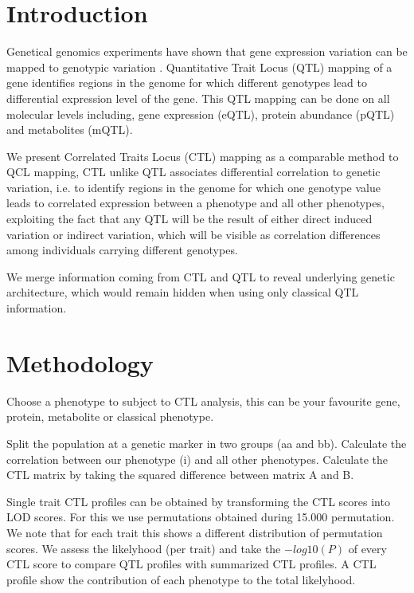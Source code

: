 \documentclass{bioinfo}
\begin{document}
\section{Introduction}
 Genetical genomics experiments have shown that gene expression variation can be mapped to 
  genotypic variation \cite{Jansen:2001}. Quantitative Trait Locus (QTL) mapping of a 
  gene identifies regions in the genome for which different genotypes lead to differential 
  expression level of the gene. This QTL mapping can be done on all molecular levels including, 
  gene expression (eQTL), protein abundance (pQTL) and metabolites (mQTL).
  
  We present Correlated Traits Locus (CTL) mapping as a comparable method to QCL mapping, 
  CTL unlike QTL associates differential correlation to genetic variation, i.e. to identify regions in the 
  genome for which one genotype value leads to correlated expression between a phenotype and all 
  other phenotypes, exploiting the fact that any QTL will be the result of either direct induced 
  variation or indirect variation, which will be visible as correlation differences among 
  individuals carrying different genotypes.
  
  We merge information coming from CTL and QTL to reveal underlying genetic architecture, which 
  would remain hidden when using only classical QTL information.

\section{Methodology}
  Choose a phenotype to subject to CTL analysis, this can be your favourite gene, 
  protein, metabolite or classical phenotype.

  Split the population at a genetic marker in two groups (aa and bb). Calculate the correlation 
  between our phenotype (i) and all other phenotypes. Calculate the CTL matrix by taking the 
  squared difference between matrix A and B.

  Single trait CTL profiles can be obtained by transforming the CTL scores into LOD scores. 
  For this we use permutations obtained during 15.000 permutation. We note that for each trait this 
  shows a different distribution of permutation scores. We assess the likelyhood (per trait) and 
  take the $-log10(P)$ of every CTL score to compare QTL profiles with summarized CTL profiles. A CTL profile show the contribution of each phenotype to 
  the total likelyhood.
\end{document}

